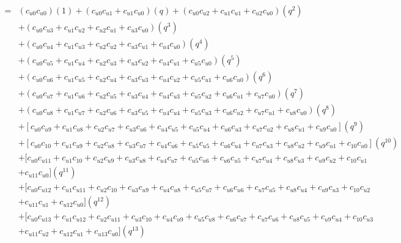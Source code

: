 \documentclass[12pt]{article}
\begin{document}
\begin{align}
    =& (c_{u0}c_{u0})(1) + (c_{u0}c_{u1} + c_{u1}c_{u0})(q) + (c_{u0}c_{u2} + c_{u1}c_{u1} + c_{u2}c_{u0})(q^2) \nonumber\\
    &+ (c_{u0}c_{u3} + c_{u1}c_{u2} + c_{u2}c_{u1} + c_{u3}c_{u0})(q^3) \nonumber\\
    &+ ( c_{u0}c_{u4} + c_{u1}c_{u3} + c_{u2}c_{u2} + c_{u3}c_{u1} + c_{u4}c_{u0})(q^4) \nonumber\\
    &+ (c_{u0}c_{u5} + c_{u1}c_{u4} + c_{u2}c_{u3} + c_{u3}c_{u2} + c_{u4}c_{u1} + c_{u5}c_{u0})(q^5) \nonumber\\
    &+ (c_{u0}c_{u6} + c_{u1}c_{u5} + c_{u2}c_{u4} + c_{u3}c_{u3} + c_{u4}c_{u2} + c_{u5}c_{u1} + c_{u6}c_{u0})(q^6) \nonumber\\
    &+ (c_{u0}c_{u7} + c_{u1}c_{u6} + c_{u2}c_{u5} + c_{u3}c_{u4} + c_{u4}c_{u3} + c_{u5}c_{u2} + c_{u6}c_{u1} + c_{u7}c_{u0})(q^7) \nonumber\\
    &+ (c_{u0}c_{u8} + c_{u1}c_{u7} + c_{u2}c_{u6} + c_{u3}c_{u5} + c_{u4}c_{u4} + c_{u5}c_{u3} + c_{u6}c_{u2} + c_{u7}c_{u1} + c_{u8}c_{u0})(q^8) \nonumber\\
    &+ [c_{u0}c_{u9} + c_{u1}c_{u8} + c_{u2}c_{u7} + c_{u3}c_{u6} + c_{u4}c_{u5} + c_{u5}c_{u4} + c_{u6}c_{u3} + c_{u7}c_{u2} + c_{u8}c_{u1} + c_{u9}c_{u0}](q^9) \nonumber\\
    &+ [c_{u0}c_{10} + c_{u1}c_{u9} + c_{u2}c_{u8} + c_{u3}c_{u7} + c_{u4}c_{u6} + c_{u5}c_{u5} + c_{u6}c_{u4} + c_{u7}c_{u3} + c_{u8}c_{u2} + c_{u9}c_{u1} + c_{10}c_{u0}](q^{10}) \nonumber\\
    &+ [c_{u0}c_{u11} + c_{u1}c_{10} + c_{u2}c_{u9} + c_{u3}c_{u8} + c_{u4}c_{u7} + c_{u5}c_{u6} + c_{u6}c_{u5} + c_{u7}c_{u4} + c_{u8}c_{u3} + c_{u9}c_{u2} + c_{10}c_{u1} \nonumber\\
    &+ c_{u11}c_{u0} ](q^{11}) \nonumber\\
    &+ [c_{u0}c_{u12} + c_{u1}c_{u11} +  c_{u2}c_{10} + c_{u3}c_{u9} + c_{u4}c_{u8} + c_{u5}c_{u7} + c_{u6}c_{u6} + c_{u7}c_{u5} + c_{u8}c_{u4} + c_{u9}c_{u3} + c_{10}c_{u2} \nonumber\\
    &+ c_{u11}c_{u1} + c_{u12}c_{u0}](q^{12}) \nonumber\\
    &+ [c_{u0}c_{u13} + c_{u1}c_{u12} + c_{u2}c_{u11} + c_{u3}c_{10} + c_{u4}c_{u9} + c_{u5}c_{u8} + c_{u6}c_{u7} + c_{u7}c_{u6} + c_{u8}c_{u5} + c_{u9}c_{u4} + c_{10}c_{u3} \nonumber\\
    &+ c_{u11}c_{u2} + c_{u12}c_{u1} + c_{u13}c_{u0} ](q^{13}) \nonumber\\

\end{align}
\end{document}
